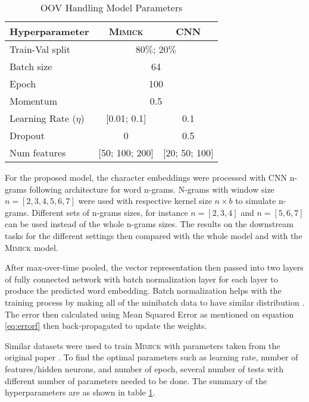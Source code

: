         \begin{table}[]
            \centering
            \caption{OOV Handling Model Parameters}
            \label{tab:hyperparameter}
            \begin{tabular}{@{}lcc@{}}
                \toprule
                \textbf{Hyperparameter} & \multicolumn{1}{c}{\textbf{\textsc{Mimick}}} & \multicolumn{1}{c}{\textbf{CNN}} \\ \midrule
                Train-Val split & \multicolumn{2}{c}{$80\%$; $20\%$}\\
                Batch size & \multicolumn{2}{c}{64} \\
                Epoch & \multicolumn{2}{c}{100} \\
                Momentum & \multicolumn{2}{c}{0.5} \\
                Learning Rate ($\eta$) & [0.01; 0.1] & 0.1 \\
                Dropout & 0 & 0.5 \\
                Num features & [50; 100; 200] & [20; 50; 100] \\ \bottomrule
            \end{tabular}
        \end{table}

        For the proposed model, the character embeddings were
        processed with CNN n-grams following
        \cite{convolutional2014kim} architecture for word n-grams.
        N-grams with window size $n = [2, 3, 4, 5, 6, 7]$ were used
        with respective kernel size $n \times b$ to simulate n-grams.
        Different sets of n-grams sizes, for instance $n = [2, 3, 4]$
        and $n = [5, 6, 7]$ can be used instead of the whole n-grams
        sizes. The results on the downstream tasks for the different
        settings then compared with the whole model and with the
        \textsc{Mimick} model.
        
        After max-over-time pooled, the vector representation then
        passed into two layers of fully connected network with batch
        normalization layer for each layer to produce the predicted
        word embedding. Batch normalization helps with the training
        process by making all of the minibatch data to have similar
        distribution \citep{batchnorm:DBLP:journals/corr/IoffeS15}.
        The error then calculated using Mean Squared Error as
        mentioned on equation \ref{eq:errorf} then back-propagated to
        update the weights.

        Similar datasets were used to train \textsc{Mimick} with
        parameters taken from the original paper
        \citep{mimicking2017Pinter}. To find the optimal parameters
        such as learning rate, number of features/hidden neurons, and
        number of epoch, several number of tests with different number
        of parameters needed to be done. The summary of the
        hyperparameters are as shown in table
        \ref{tab:hyperparameter}.

